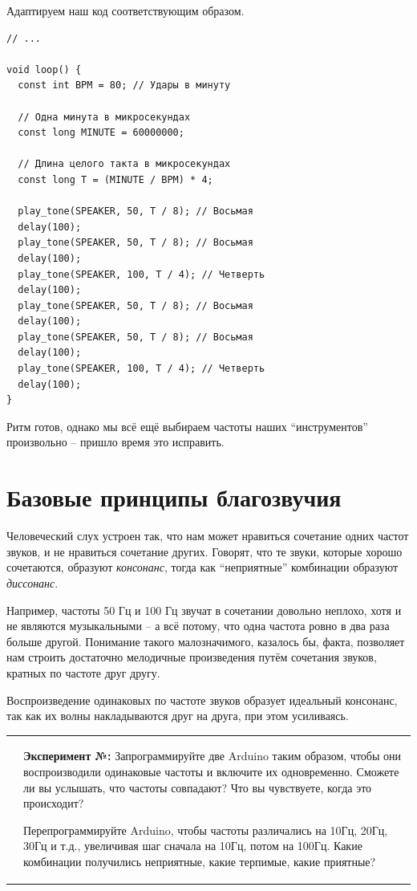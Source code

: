 \documentclass[a4paper,twoside]{book}
\newcounter{experiment-counter}
\newcommand{\experiment}[2]{
  \vspace{8pt}
  \begin{tabularx}{\textwidth}{m{1cm} m{9cm}}
    
    & \textbf{Эксперимент №\arabic{experiment-counter}:} #2 \\
  \end{tabularx}
  \addtocounter{experiment-counter}{1}
}
\begin{document}
Адаптируем наш код соответствующим образом.

\begin{verbatim}
// ...

void loop() {
  const int BPM = 80; // Удары в минуту

  // Одна минута в микросекундах
  const long MINUTE = 60000000;

  // Длина целого такта в микросекундах
  const long T = (MINUTE / BPM) * 4;

  play_tone(SPEAKER, 50, T / 8); // Восьмая
  delay(100);
  play_tone(SPEAKER, 50, T / 8); // Восьмая
  delay(100);
  play_tone(SPEAKER, 100, T / 4); // Четверть
  delay(100);
  play_tone(SPEAKER, 50, T / 8); // Восьмая
  delay(100);
  play_tone(SPEAKER, 50, T / 8); // Восьмая
  delay(100);
  play_tone(SPEAKER, 100, T / 4); // Четверть
  delay(100);
}
\end{verbatim}

Ритм готов, однако мы всё ещё выбираем частоты наших ``инструментов''
произвольно -- пришло время это исправить.

\newpage
\section{Базовые принципы благозвучия}

Человеческий слух устроен так, что нам может нравиться сочетание одних частот
звуков, и не нравиться сочетание других. Говорят, что те звуки, которые хорошо
сочетаются, образуют \emph{консонанс}, тогда как ``неприятные'' комбинации
образуют \emph{диссонанс}.

Например, частоты 50 Гц и 100 Гц звучат в сочетании довольно неплохо, хотя и не
являются музыкальными -- а всё потому, что одна частота ровно в два раза больше
другой. Понимание такого малозначимого, казалось бы, факта, позволяет нам
строить достаточно мелодичные произведения путём сочетания звуков, кратных по
частоте друг другу.

Воспроизведение одинаковых по частоте звуков образует идеальный консонанс, так
как их волны накладываются друг на друга, при этом усиливаясь.

\experiment{0}{ Запрограммируйте две Arduino таким образом, чтобы они
  воспроизводили одинаковые частоты и включите их одновременно. Сможете ли вы
  услышать, что частоты совпадают?  Что вы чувствуете, когда это происходит?

  Перепрограммируйте Arduino, чтобы частоты различались на 10Гц, 20Гц, 30Гц и
  т.д., увеличивая шаг сначала на 10Гц, потом на 100Гц. Какие комбинации
  получились неприятные, какие терпимые, какие приятные?}
\end{document}
